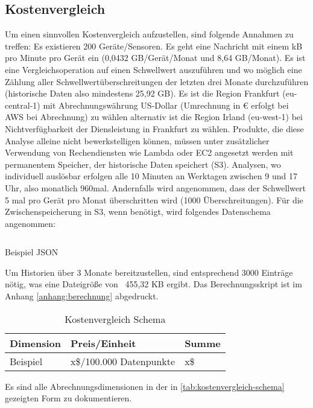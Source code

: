 \subsection{Kostenvergleich}
Um einen sinnvollen Kostenvergleich aufzustellen, sind folgende Annahmen zu treffen:
Es existieren 200 Geräte/Sensoren. Es geht eine Nachricht mit einem kB pro Minute pro Gerät ein (0,0432 GB/Gerät/Monat und 8,64 GB/Monat).
Es ist eine Vergleichsoperation auf einen Schwellwert auszuführen und wo möglich eine Zählung aller Schwellwertüberschreitungen der letzten drei Monate durchzuführen (historische Daten also mindestens 25,92 GB).  Es ist die Region Frankfurt (eu-central-1) mit Abrechnungswährung US-Dollar (Umrechnung in € erfolgt bei \ac{AWS} bei Abrechnung) zu wählen alternativ ist die Region Irland (eu-west-1) bei Nichtverfügbarkeit der Diensleistung in Frankfurt zu wählen. Produkte, die diese Analyse alleine nicht bewerkstelligen können, müssen unter zusätzlicher Verwendung von Rechendiensten wie Lambda oder \ac{EC2} angesetzt werden mit permanentem Speicher, der historische Daten speichert (\ac{S3}). Analysen, wo individuell auslösbar erfolgen alle 10 Minuten an Werktagen zwischen 9 und 17 Uhr, also monatlich 960mal. Andernfalls wird angenommen, dass der Schwellwert 5 mal pro Gerät pro Monat überschritten wird (1000 Überschreitungen).
Für die Zwischenspeicherung in \ac{S3}, wenn benötigt, wird folgendes Datenschema angenommen:

\begin{listing}[H]
\inputminted[frame=lines,breaklines=true]{json}{code/estimates/filtered-estimate.json}
\caption[Beispiel JSON]{Beispiel \ac{JSON}}
\label{listing:json}
\end{listing}
Um Historien über 3 Monate bereitzustellen, sind entsprechend 3000 Einträge nötig, was eine Dateigröße von ~455,32 KB ergibt. Das Berechnungsskript ist im Anhang \ref{anhang:berechnung} abgedruckt.


\begin{table}[H]
\centering
\begin{tabular}{|l|l|l|}
\hline
Dimension & Preis/Einheit           & Summe \\ \hline
Beispiel  & x\$/100.000 Datenpunkte & x\$  \\\hline
\end{tabular}
\caption{Kostenvergleich Schema}
\label{tab:kostenvergleich-schema}
\end{table}
Es sind alle Abrechnungsdimensionen in der in \autoref{tab:kostenvergleich-schema} gezeigten Form zu dokumentieren.
